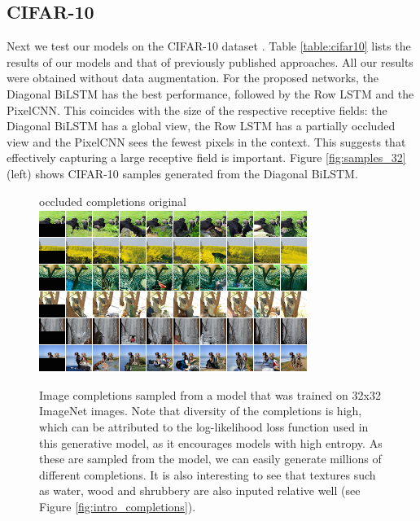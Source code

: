 \subsection{CIFAR-10}

Next we test our models on the CIFAR-10 dataset \cite{krizhevsky2009learning}. Table \ref{table:cifar10} lists the results of our models and that of previously published approaches. All our results were obtained without data augmentation. For the proposed networks, the Diagonal BiLSTM has the best performance, followed by the Row LSTM and the PixelCNN. This coincides with the size of the respective receptive fields: the Diagonal BiLSTM has a global view, the Row LSTM has a partially occluded view and the PixelCNN sees the fewest pixels in the context. This suggests that effectively capturing a large receptive field is important. 
Figure \ref{fig:samples_32} (left) shows CIFAR-10 samples generated from the Diagonal BiLSTM.

\begin{figure}[!ht]
\centering
\hspace{0.02cm} {occluded} \hfill completions \hfill{original} \,
\vspace{0.1cm}
\includegraphics[width=\linewidth]{compl1_2.png}
\vspace{-0.5cm}
\caption{Image completions sampled from a model that was trained on 32x32 ImageNet images. Note that diversity of the completions is high, which can be attributed to the log-likelihood loss function used in this generative model, as it encourages models with high entropy. As these are sampled from the model, we can easily generate millions of different completions. It is also interesting to see that textures such as water, wood and shrubbery are also inputed relative well (see Figure \ref{fig:intro_completions}).}
\label{fig:completions}
\vspace{-0.2cm}
\end{figure}

